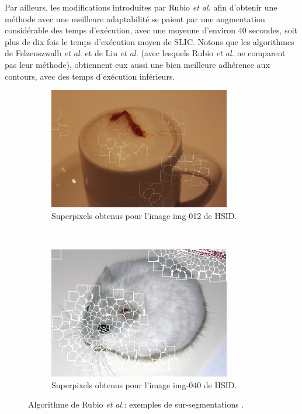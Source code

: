 Par ailleurs, les modifications introduites par Rubio \textit{et al.} afin d'obtenir une méthode avec une meilleure adaptabilité se paient par une augmentation considérable des temps d’exécution, avec une moyenne d'environ $40$ secondes, soit plus de dix fois le temps d'exécution moyen de SLIC. Notons que les algorithmes de Felzenszwalb \textit{et al.} \cite{felzenszwalb2004efficient} et de Liu \textit{et al.} \cite{liu2011entropy} (avec lesquels Rubio \textit{et al.} ne comparent pas leur méthode), obtiennent eux aussi une bien meilleure adhérence aux contours, avec des temps d'exécution inférieurs.
 
 
   \begin{figure}[htb]
	\centering
	 \begin{subfigure}[t]{0.45\textwidth}	
			\includegraphics[width=\textwidth]{images/sur-segmentation/BASS/EX1-img-012}
		 	\caption{Superpixels obtenus pour l'image img-012 de HSID.}
	\end{subfigure}
 ~
	 \begin{subfigure}[t]{0.45\textwidth}	
			\includegraphics[width=\textwidth]{images/sur-segmentation/BASS/EX2-img-040}
		 	\caption{Superpixels obtenus pour l'image img-040 de HSID.}
	\end{subfigure}
	\caption{Algorithme de Rubio \textit{et al.}: exemples de sur-segmentations .}
	\label{fig:sp:exbass1}
 \end{figure}


